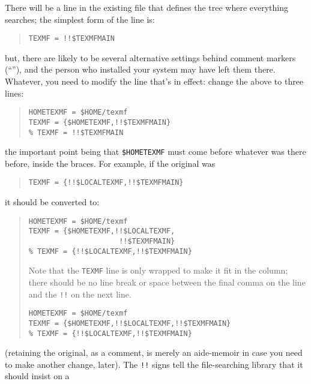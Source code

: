 There will be a line in the existing file that defines the tree where
everything searches; the simplest form of the line is:
\begin{quote}
\begin{verbatim}
TEXMF = !!$TEXMFMAIN
\end{verbatim}
\end{quote}
but, there are likely to be several alternative settings behind
comment markers (``\texttt{\textpercent{}}''), and the person who 
installed your system may have left them there.  Whatever, you need to
modify the line that's in effect: change the above to three lines:
\begin{quote}
\begin{verbatim}
HOMETEXMF = $HOME/texmf
TEXMF = {$HOMETEXMF,!!$TEXMFMAIN}
% TEXMF = !!$TEXMFMAIN
\end{verbatim}
\end{quote}
the important point being that \texttt{\$HOMETEXMF} must come before
whatever was there before, inside the braces.  For example, if the
original was
\begin{quote}
\begin{verbatim}
TEXMF = {!!$LOCALTEXMF,!!$TEXMFMAIN}
\end{verbatim}
\end{quote}
it should be converted to:
\begin{quote}
\begin{narrowversion}
\begin{verbatim}
HOMETEXMF = $HOME/texmf
TEXMF = {$HOMETEXMF,!!$LOCALTEXMF,
                     !!$TEXMFMAIN}
% TEXMF = {!!$LOCALTEXMF,!!$TEXMFMAIN}
\end{verbatim}
{\small Note that the \texttt{TEXMF} line is only wrapped to make it
  fit in the column; there should be no line break or space between
  the final comma on the line and the \texttt{!!} on the next line.\par
}%
\end{narrowversion}
\begin{wideversion}
\begin{verbatim}
HOMETEXMF = $HOME/texmf
TEXMF = {$HOMETEXMF,!!$LOCALTEXMF,!!$TEXMFMAIN}
% TEXMF = {!!$LOCALTEXMF,!!$TEXMFMAIN}
\end{verbatim}
\end{wideversion}
\end{quote}
(retaining the original, as a comment, is merely an aide-memoir in
case you need to make another change, later).  The \texttt{!!} signs
tell the file-searching library that it should insist on a
